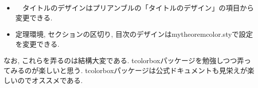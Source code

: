 \documentclass[11pt,a4paper,oneside,lualatex]{ltjsarticle} %
\numberwithin{equation}{section} %
\begin{document}

\begin{itemize}
	\item 　タイトルのデザインはプリアンブルの「タイトルのデザイン」の項目から変更できる. 
	\item 定理環境, セクションの区切り, 目次のデザインはmytheoremcolor.styで設定を変更できる. 
\end{itemize}

なお, これらを弄るのは結構大変である. 
tcolorboxパッケージを勉強しつつ弄ってみるのが楽しいと思う.
tcolorboxパッケージは公式ドキュメントも見栄えが楽しいのでオススメである.




\end{document}
